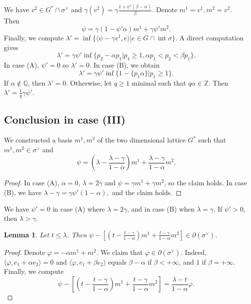 \documentclass[12pt,reqno]{amsart}
\newcommand{\Q}{{\mathbb Q}}
\newcommand{\Z}{{\mathbb Z}}
\newcommand{\Int}{\operatorname{int}}
\theoremstyle{plain}
\newtheorem{lem}[thm]{Lemma}
\theoremstyle{definition}
\theoremstyle{remark}
\begin{document}
We have $v^2\in G^*\cap \sigma^\vee$ and
$\gamma(v^2)=\gamma\frac{1+\psi'(\beta-\alpha)}{\beta}$.
Denote $m^1=v^1,m^2=v^2$. Then
$$
\psi=\gamma(1-\psi'\alpha)m^1+\gamma\psi'm^2.
$$
Finally, we compute 
$\lambda'=\inf\{\langle \psi-\gamma v^1,e\rangle \vert e\in G\cap \Int \sigma\}$.
A direct computation gives
$$
\lambda'=\gamma\psi'\inf\{p_2-\alpha p_1 \vert p_1\ge 1,\alpha p_1<p_2<\beta p_1\}.
$$
In case (A), $\psi'=0$ so $\lambda'=0$. In case (B), we obtain
$$
\lambda'=\gamma\psi'\inf\{1-\{p_1\alpha\} \vert p_1\ge 1\}.
$$
If $\alpha\notin \Q$, then $\lambda'=0$. Otherwise, let $q\ge 1$ minimal
such that $q\alpha\in \Z$. Then $\lambda'=\frac{1}{q}\gamma\psi'$.



\subsection{Conclusion in case (III)}

We constructed a basis $m^1,m^2$ of the two dimensional lattice $G^*$ such that $m^1,m^2\in \sigma^\vee$ and 
$$
\psi=(\lambda-\frac{\lambda-\gamma}{1-\alpha})m^1+ 
\frac{\lambda-\gamma}{1-\alpha}m^2.
$$

\begin{proof}
In case (A), $\alpha=0$, $\lambda=2\gamma$ and $\psi=\gamma m^1+\gamma m^2$, so the claim holds. In case (B), we have
$
\lambda-\gamma=\gamma \psi'(1-\alpha),
$
and the claim holds.
\end{proof}

We have $\psi'=0$ in case (A) where $\lambda=2\gamma$, and in case (B) when $\lambda=\gamma$. If $\psi'>0$, then $\lambda>\gamma$.

\begin{lem}\label{dif}
Let $t\le \lambda$. Then 
$\psi-[(t-\frac{t-\gamma}{1-\alpha})m^1+ 
\frac{t-\gamma}{1-\alpha}m^2]\in \partial(\sigma^\vee)$.
\end{lem}

\begin{proof} Denote $\varphi=-\alpha m^1+m^2$. We claim that 
$\varphi\in \partial(\sigma^\vee)$. Indeed, $\langle \varphi,e_1+\alpha e_2\rangle=0$ and $\langle \varphi,e_1+\beta e_2\rangle$ equals $\beta-\alpha$ if $\beta<+\infty$, and $1$ if $\beta=+\infty$.
Finally, we compute
$$
\psi-[(t-\frac{t-\gamma}{1-\alpha})m^1+ 
\frac{t-\gamma}{1-\alpha}m^2]=
\frac{\lambda-t}{1-\alpha}\varphi.
$$

\end{proof}
\end{document}
